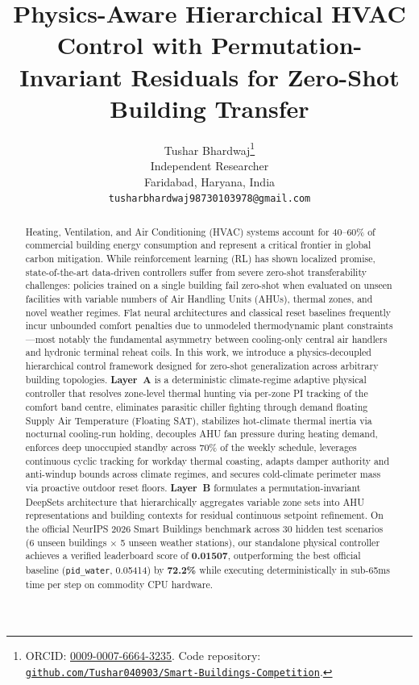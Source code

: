 \documentclass{article}
\title{Physics-Aware Hierarchical HVAC Control with Permutation-Invariant Residuals for Zero-Shot Building Transfer}
\author{%
  Tushar Bhardwaj\thanks{ORCID: \href{https://orcid.org/0009-0007-6664-3235}{0009-0007-6664-3235}. Code repository: \href{https://github.com/Tushar040903/Smart-Buildings-Competition}{\texttt{github.com/Tushar040903/Smart-Buildings-Competition}}.} \\
  Independent Researcher \\
  Faridabad, Haryana, India \\
  \texttt{tusharbhardwaj98730103978@gmail.com} \\
}
\begin{document}
\maketitle

\begin{abstract}
Heating, Ventilation, and Air Conditioning (HVAC) systems account for 40--60\% of commercial building energy consumption and represent a critical frontier in global carbon mitigation. While reinforcement learning (RL) has shown localized promise, state-of-the-art data-driven controllers suffer from severe zero-shot transferability challenges: policies trained on a single building fail zero-shot when evaluated on unseen facilities with variable numbers of Air Handling Units (AHUs), thermal zones, and novel weather regimes. Flat neural architectures and classical reset baselines frequently incur unbounded comfort penalties due to unmodeled thermodynamic plant constraints---most notably the fundamental asymmetry between cooling-only central air handlers and hydronic terminal reheat coils. In this work, we introduce a physics-decoupled hierarchical control framework designed for zero-shot generalization across arbitrary building topologies. \textbf{Layer~A} is a deterministic climate-regime adaptive physical controller that resolves zone-level thermal hunting via per-zone PI tracking of the comfort band centre, eliminates parasitic chiller fighting through demand floating Supply Air Temperature (Floating SAT), stabilizes hot-climate thermal inertia via nocturnal cooling-run holding, decouples AHU fan pressure during heating demand, enforces deep unoccupied standby across 70\% of the weekly schedule, leverages continuous cyclic tracking for workday thermal coasting, adapts damper authority and anti-windup bounds across climate regimes, and secures cold-climate perimeter mass via proactive outdoor reset floors. \textbf{Layer~B} formulates a permutation-invariant DeepSets architecture that hierarchically aggregates variable zone sets into AHU representations and building contexts for residual continuous setpoint refinement. On the official NeurIPS 2026 Smart Buildings benchmark across 30 hidden test scenarios (6 unseen buildings $\times$ 5 unseen weather stations), our standalone physical controller achieves a verified leaderboard score of \textbf{0.01507}, outperforming the best official baseline (\texttt{pid\_water}, 0.05414) by \textbf{72.2\%} while executing deterministically in sub-65ms time per step on commodity CPU hardware.
\end{abstract}
\end{document}
